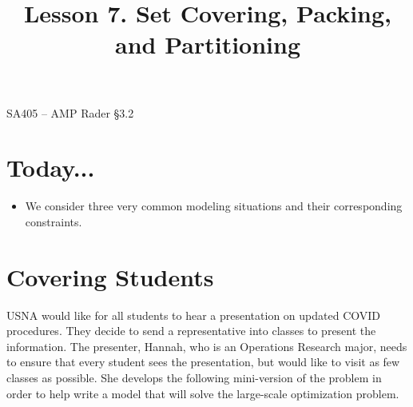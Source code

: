 \documentclass[11pt]{article}
\makeatletter
\theoremstyle{definition}
\renewcommand{\maketitle}{
  \noindent SA405 -- AMP \hfill Rader \S 3.2 \\

  \begin{center}\Large{\textbf{\@title}}\end{center}
}
\makeatother
\begin{document}
  
\title{Lesson 7.  Set Covering, Packing, and Partitioning}

\maketitle

\section{Today...}

\begin{itemize}
	\item  We consider three very common modeling situations and their corresponding constraints.
\end{itemize}

\section{Covering Students}
USNA would like for all students to hear a presentation on updated COVID procedures.  They decide to send a representative into classes to present the information.  The presenter, Hannah, who is an Operations Research major, needs to ensure that every student sees the presentation, but would like to visit as few classes as possible.  She develops the following mini-version of the problem in order to help write a model that will solve the large-scale optimization problem.
\end{document}
